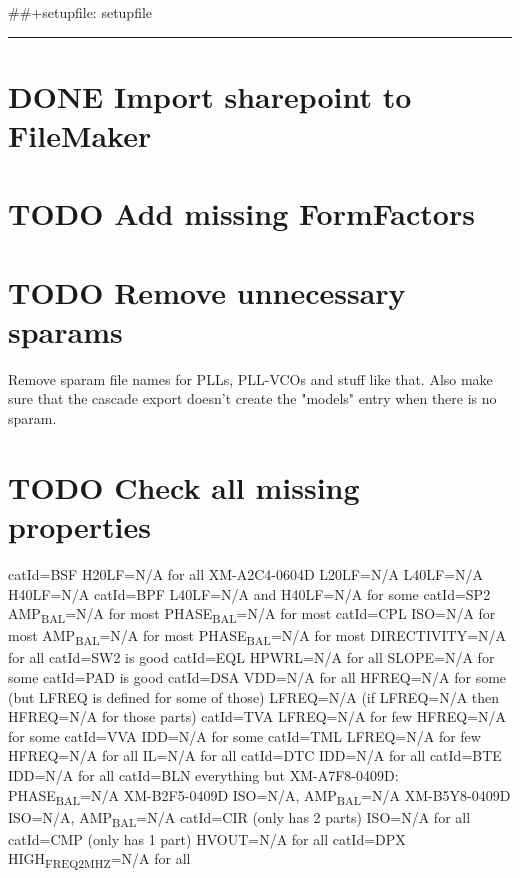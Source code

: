 \documentclass[11pt]{article}
\author{Cole Turner}
\date{\today}
\title{}
\begin{document}
\tableofcontents

\#\#+setupfile: setupfile

\noindent\rule{\textwidth}{0.5pt}
\section{{\bfseries\sffamily DONE}  Import sharepoint to FileMaker}
\label{sec:org90952e4}
\section{{\bfseries\sffamily TODO}  Add missing FormFactors}
\label{sec:org93329eb}
\section{{\bfseries\sffamily TODO}  Remove unnecessary sparams}
\label{sec:org827afec}
Remove sparam file names for PLLs, PLL-VCOs and stuff like that. Also make sure that the cascade export doesn't create the "models" entry when there is no sparam.
\section{{\bfseries\sffamily TODO}  Check all missing properties}
\label{sec:org8e3e8ee}
catId=BSF
  H20LF=N/A for all
  XM-A2C4-0604D L20LF=N/A L40LF=N/A H40LF=N/A
catId=BPF
  L40LF=N/A and H40LF=N/A for some
catId=SP2
  AMP\textsubscript{BAL}=N/A for most
  PHASE\textsubscript{BAL}=N/A for most
catId=CPL
  ISO=N/A for most
  AMP\textsubscript{BAL}=N/A for most
  PHASE\textsubscript{BAL}=N/A for most
  DIRECTIVITY=N/A for all
catId=SW2 is good
catId=EQL
  HPWRL=N/A for all
  SLOPE=N/A for some
catId=PAD is good
catId=DSA
  VDD=N/A for all
  HFREQ=N/A for some (but LFREQ is defined for some of those)
  LFREQ=N/A (if LFREQ=N/A then HFREQ=N/A for those parts)
catId=TVA
  LFREQ=N/A for few
  HFREQ=N/A for some
catId=VVA
  IDD=N/A for some
catId=TML
  LFREQ=N/A for few
  HFREQ=N/A for all
  IL=N/A for all
catId=DTC
  IDD=N/A for all
catId=BTE
  IDD=N/A for all
catId=BLN
  everything but XM-A7F8-0409D: PHASE\textsubscript{BAL}=N/A
  XM-B2F5-0409D ISO=N/A, AMP\textsubscript{BAL}=N/A
  XM-B5Y8-0409D ISO=N/A, AMP\textsubscript{BAL}=N/A
catId=CIR (only has 2 parts)
   ISO=N/A for all
catId=CMP (only has 1 part)
  HVOUT=N/A for all
catId=DPX
  HIGH\textsubscript{FREQ}\textsubscript{2}\textsubscript{MHZ}=N/A for all
\end{document}
